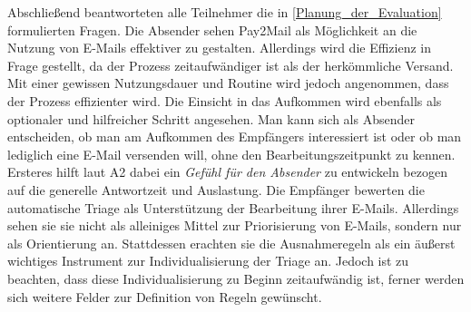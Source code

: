 Abschließend beantworteten alle Teilnehmer die in \ref{Planung_der_Evaluation} formulierten Fragen. Die Absender sehen Pay2Mail als Möglichkeit an die Nutzung von E-Mails effektiver zu gestalten. Allerdings wird die Effizienz in Frage gestellt, da der Prozess zeitaufwändiger ist als der herkömmliche Versand. Mit einer gewissen Nutzungsdauer und Routine wird jedoch angenommen, dass der Prozess effizienter wird. Die Einsicht in das Aufkommen wird ebenfalls als optionaler und hilfreicher Schritt angesehen. Man kann sich als Absender entscheiden, ob man am Aufkommen des Empfängers interessiert ist oder ob man lediglich eine E-Mail versenden will, ohne den Bearbeitungszeitpunkt zu kennen. Ersteres hilft laut A2 dabei ein \emph{\glqq Gefühl für den Absender\grqq{}} zu entwickeln bezogen auf die generelle Antwortzeit und Auslastung. Die Empfänger bewerten die automatische Triage als Unterstützung der Bearbeitung ihrer E-Mails. Allerdings sehen sie sie nicht als alleiniges Mittel zur Priorisierung von E-Mails, sondern nur als Orientierung an. Stattdessen erachten sie die Ausnahmeregeln als ein äußerst wichtiges Instrument zur Individualisierung der Triage an. Jedoch ist zu beachten, dass diese Individualisierung zu Beginn zeitaufwändig ist, ferner werden sich weitere Felder zur Definition von Regeln gewünscht. 

